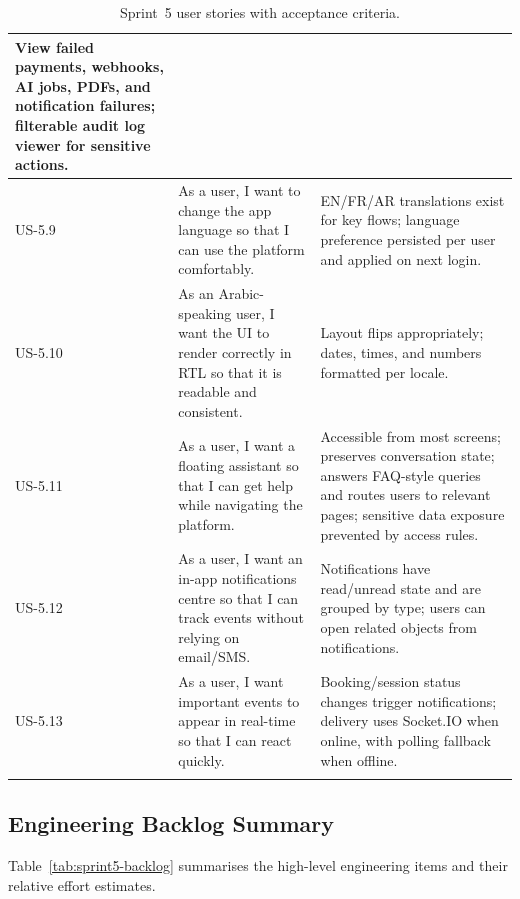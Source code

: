 \documentclass[a4paper,12pt]{report}
\begin{document}
\begin{longtable}{@{} L{0.10\textwidth} L{0.50\textwidth} L{0.32\textwidth} @{}}
View failed payments, webhooks, AI jobs, PDFs, and notification failures; filterable audit log viewer for sensitive actions. \\
\midrule
US-5.9 & As a user, I want to change the app language so that I can use the platform comfortably. &
EN/FR/AR translations exist for key flows; language preference persisted per user and applied on next login. \\
\midrule
US-5.10 & As an Arabic-speaking user, I want the UI to render correctly in RTL so that it is readable and consistent. &
Layout flips appropriately; dates, times, and numbers formatted per locale. \\
\midrule
US-5.11 & As a user, I want a floating assistant so that I can get help while navigating the platform. &
Accessible from most screens; preserves conversation state; answers FAQ-style queries and routes users to relevant pages; sensitive data exposure prevented by access rules. \\
\midrule
US-5.12 & As a user, I want an in-app notifications centre so that I can track events without relying on email/SMS. &
Notifications have read/unread state and are grouped by type; users can open related objects from notifications. \\
\midrule
US-5.13 & As a user, I want important events to appear in real-time so that I can react quickly. &
Booking/session status changes trigger notifications; delivery uses Socket.IO when online, with polling fallback when offline. \\
\bottomrule
\caption{Sprint~5 user stories with acceptance criteria.}
\label{tab:sprint5-userstories}\\
\end{longtable}

\subsection{Engineering Backlog Summary}

Table~\ref{tab:sprint5-backlog} summarises the high-level engineering items and their
relative effort estimates.
\end{document}
